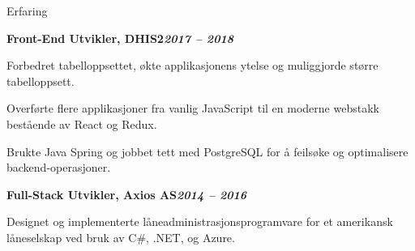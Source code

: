 \begin{rubric}{Erfaring}
\begin{compactitem}
    \vspace{-12pt}
\end{compactitem}
%
\entry*[]%
\textbf{Front-End Utvikler, DHIS2\hfill\textit{2017 -- 2018}} \par
    \begin{compactitem}
    \item Forbedret tabelloppsettet, økte applikasjonens ytelse og muliggjorde større tabelloppsett.
    \item Overførte flere applikasjoner fra vanlig JavaScript til en moderne webstakk bestående av React og Redux.
    \item Brukte Java Spring og jobbet tett med PostgreSQL for å feilsøke og optimalisere backend-operasjoner.
    \vspace{-12pt}
\end{compactitem}
%
\entry*[]%
\textbf{Full-Stack Utvikler, Axios AS\hfill\textit{2014 -- 2016}} \par
\begin{compactitem}
    \item Designet og implementerte låneadministrasjonsprogramvare for et amerikansk låneselskap ved bruk av C\#, .NET, og Azure.
    \vspace{-12pt}
\end{compactitem}
%
\end{rubric}
